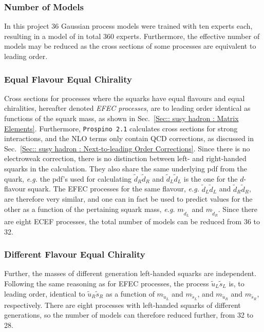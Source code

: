 \documentclass[twoside,english]{uiofysmaster}
\begin{document}
{\subsubsection{Number of Models}

In this project 36 Gaussian process models were trained with ten experts each, resulting in a model of in total 360 experts. Furthermore, the effective number of models may be reduced as the cross sections of some processes are equivalent to leading order. 

\subsubsection{Equal Flavour Equal Chirality}

Cross sections for processes where the squarks have equal flavours and equal chiralities, hereafter denoted \textit{EFEC processes}, are to leading order identical as functions of the squark mass, as shown in Sec.~\ref{Sec:: susy hadron : Matrix Elements}. Furthermore, \verb|Prospino 2.1| calculates cross sections for strong interactions, and the NLO terms only contain QCD corrections, as discussed in Sec.~\ref{Sec:: susy hadron : Next-to-leading Order Corrections}. Since there is no electroweak correction, there is no distinction between left- and right-handed squarks in the calculation. They also share the same underlying pdf from the quark, \textit{e.g.} the pdf's used for calculating $\widetilde{d}_R \widetilde{d}_R$ and $\widetilde{d}_L \widetilde{d}_L$ is the one for the $d$-flavour squark. The EFEC processes for the same flavour, \textit{e.g.} $\widetilde{d}_L \widetilde{d}_L$ and $\widetilde{d}_R \widetilde{d}_R$, are therefore very similar, and one can in fact be used to predict values for the other as a function of the pertaining squark mass, \textit{e.g.} $m_{\widetilde{d}_L}$ and $m_{\widetilde{d}_R}$. Since there are eight ECEF processes, the total number of models can be reduced from 36 to 32.

\subsubsection{Different Flavour Equal Chirality}

Further, the masses of different generation left-handed squarks are independent. Following the same reasoning as for EFEC processes, the process $\widetilde{u}_L \widetilde{s}_L$ is, to leading order, identical to $\widetilde{u}_R \widetilde{s}_R$ as a function of $m_{\widetilde{u}_L}$ and $m_{\widetilde{s}_L}$, and $m_{\widetilde{u}_R}$ and $m_{\widetilde{s}_R}$, respectively. There are eight processes with left-handed squarks of different generations, so the number of models can therefore reduced further, from 32 to 28.

}
\end{document}
